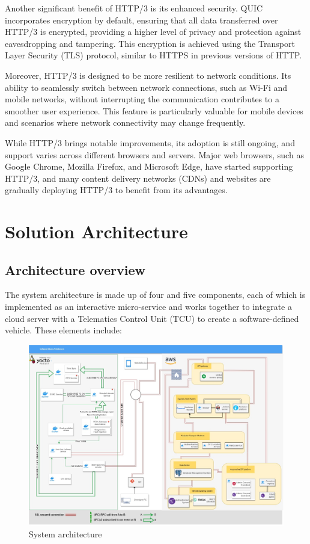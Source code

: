 \documentclass[
12pt,
oneside, 
onehalfspacing, 
nolistspacing, 
parskip, 
chapterinoneline, 
]{AASTCOMPUTER}
\begin{document}
Another significant benefit of HTTP/3 is its enhanced security. QUIC incorporates encryption by default, ensuring that all data transferred over HTTP/3 is encrypted, providing a higher level of privacy and protection against eavesdropping and tampering. This encryption is achieved using the Transport Layer Security (TLS) protocol, similar to HTTPS in previous versions of HTTP.

Moreover, HTTP/3 is designed to be more resilient to network conditions. Its ability to seamlessly switch between network connections, such as Wi-Fi and mobile networks, without interrupting the communication contributes to a smoother user experience. This feature is particularly valuable for mobile devices and scenarios where network connectivity may change frequently.

While HTTP/3 brings notable improvements, its adoption is still ongoing, and support varies across different browsers and servers. Major web browsers, such as Google Chrome, Mozilla Firefox, and Microsoft Edge, have started supporting HTTP/3, and many content delivery networks (CDNs) and websites are gradually deploying HTTP/3 to benefit from its advantages.

\chapter{Solution Architecture}

\section{Architecture overview}
The system architecture is made up of four and five components, each of which is implemented as an interactive micro-service and works together to integrate a cloud server with a Telematics Control Unit (TCU) to create a software-defined vehicle. These elements include:


\begin{figure}[!ht]
	\centering
	\includegraphics[scale=0.4]{Figures/Architicture/overview.jpg}
  	\caption{System architecture}
  	\label{fig:System architecture}
\end{figure}
\newpage
\end{document}

